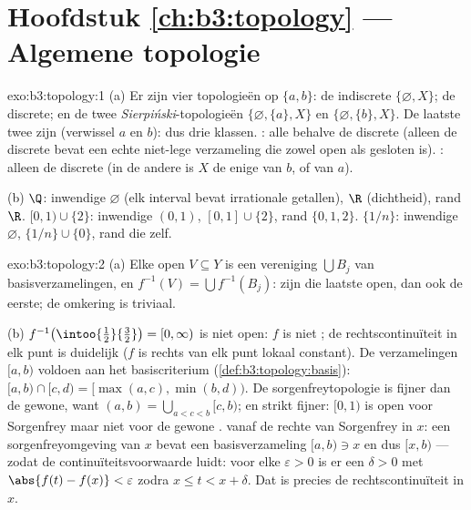 \section*{Hoofdstuk \ref{ch:b3:topology} --- Algemene topologie}

\begin{solution}{exo:b3:topology:1}
(a) Er zijn vier topologieën op $\{a,b\}$: de indiscrete
$\{\varnothing, X\}$; de discrete; en de twee
\emph{Sierpiński}-topologieën $\{\varnothing, \{a\}, X\}$ en
$\{\varnothing, \{b\}, X\}$. De laatste twee zijn 
(verwissel $a$ en $b$): dus drie klassen. : alle
behalve de discrete (alleen de discrete  bevat een echte
niet-lege verzameling die zowel open als gesloten is). :
alleen de discrete (in de andere is $X$ de enige  van $b$,
of van $a$).

(b) $\Q$: inwendige $\varnothing$ (elk interval bevat irrationale
getallen),  $\R$ (dichtheid), rand $\R$. $[0,1) \cup
\{2\}$: inwendige $(0,1)$,  $[0,1]\cup\{2\}$, rand $\{0,
1, 2\}$. $\{1/n\}$: inwendige $\varnothing$, 
$\{1/n\}\cup\{0\}$, rand die  zelf.
\end{solution}

\begin{solution}{exo:b3:topology:2}
(a) Elke open $V \subseteq Y$ is een vereniging $\bigcup B_j$ van
basisverzamelingen, en $f^{-1}(V) = \bigcup f^{-1}(B_j)$: zijn die
laatste open, dan ook de eerste; de omkering is triviaal.

(b) $f^{-1}\bigl(\intoo{\frac12}{\frac32}\bigr) = [0, \infty)$ is
niet open: $f$ is niet ; de rechtscontinuïteit in elk punt
is duidelijk ($f$ is rechts van elk punt lokaal constant). De
verzamelingen $[a, b)$ voldoen aan het basiscriterium
(\cref{def:b3:topology:basis}): $[a,b)\cap[c,d) = [\max(a,c),
\min(b,d))$. De sorgenfreytopologie is fijner dan de gewone, want
$(a, b) = \bigcup_{a < c < b}[c, b)$; en strikt fijner: $[0,1)$ is
open voor Sorgenfrey maar niet voor de gewone .
 vanaf de rechte van Sorgenfrey in $x$: een
sorgenfreyomgeving van $x$ bevat een basisverzameling $[a, b) \ni
x$ en dus $[x, b)$ --- zodat de continuïteitsvoorwaarde luidt:
voor elke $\varepsilon > 0$ is er een $\delta > 0$ met $\abs{f(t)
- f(x)} < \varepsilon$ zodra $x \leq t < x + \delta$. Dat is
precies de rechtscontinuïteit in $x$.
\end{solution}

